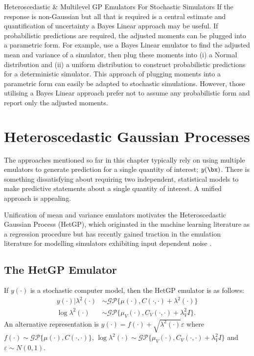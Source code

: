 \begin{chapter}{Heteroscedastic \& Multilevel GP Emulators For Stochastic Simulators\label{Ch:Hetsml}}
If the response is non-Gaussian but all that is required is a central estimate and quantification of uncertainty a Bayes Linear approach may be useful. If probabilistic predictions are required, the adjusted moments can be plugged into a parametric form. For example, \citet{Jackson2019} use a Bayes Linear emulator to find the adjusted mean and variance of a simulator, then plug these moments into (i) a Normal distribution and (ii) a uniform distribution to construct probabilistic predictions for a deterministic simulator. This approach of plugging moments into a parametric form can easily be adapted to stochastic simulations. However, those utilising a Bayes Linear approach prefer not to assume any probabilistic form and report only the adjusted moments.

\section{Heteroscedastic Gaussian Processes}

The approaches mentioned so far in this chapter typically rely on using multiple emulators to generate prediction for a single quantity of interest; $y(\bx)$. There is something dissatisfying about requiring two independent, statistical models to make predictive statements about a single quantity of interest. A unified approach is appealing.

Unification of mean and variance emulators motivates the Heteroscedastic Gaussian Process (HetGP), which originated in the machine learning literature as a regression procedure \citep{Goldberg1998} but has recently gained traction in the emulation literature for modelling simulators exhibiting input dependent noise \citep{Binois2018, Baker2020c}.

\subsection{The HetGP Emulator}

If $y(\cdot)$ is a stochastic computer model, then the HetGP emulator is as follows:
\begin{align}
y(\cdot) | \lambda^2(\cdot) &\sim  \mathcal{GP} \{ \mu(\cdot), C(\cdot, \cdot) + \lambda^2(\cdot) \} \label{Eq:} \\
\log \lambda^2 (\cdot) &\sim  \mathcal{GP} \{ \mu_V (\cdot), C_V (\cdot, \cdot) + \lambda_{V}^2 I \}.
\end{align}
An alternative representation is $y(\cdot) = f(\cdot) + \sqrt{\lambda^2(\cdot)} \varepsilon$  where $f(\cdot) \sim \mathcal{GP}\{ \mu(\cdot), C(\cdot, \cdot) \}$, $\log \lambda^2(\cdot) \sim \mathcal{GP}\{\mu_V(\cdot), C_V(\cdot, \cdot) + \lambda_V^2I \}$ and $\varepsilon \sim N(0, 1)$.


\end{chapter}
